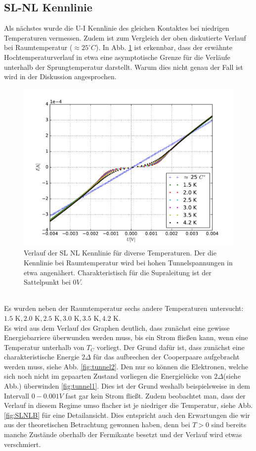 \documentclass[twoside,        %
               BCOR12mm,       %
               english,ngerman, %
               fleqn,headsepline=false,footsepline=false
              ]{MFPREPORT}
\begin{document}
\subsection{SL-NL Kennlinie}

Als nächstes wurde die U-I Kennlinie des gleichen Kontaktes bei niedrigen Temperaturen vermessen. Zudem ist zum Vergleich der oben diskutierte Verlauf bei Raumtemperatur ($\approx 25^{\circ} C$). In Abb. \ref{fig:SLNL} ist erkennbar, dass der erwähnte Hochtemperaturverlauf in etwa eine asymptotische Grenze für die Verläufe unterhalb der Sprungtemperatur darstellt. Warum dies nicht genau der Fall ist wird in der Diskussion angesprochen.
\begin{figure}
\centering
\includegraphics[scale=0.7]{2.pdf}
\caption{Verlauf der SL NL Kennlinie für diverse Temperaturen. Der die Kennlinie bei Raumtemperatur wird bei hohen Tunnelspannungen in etwa angenähert. Charakteristisch für die Supraleitung ist der Sattelpunkt bei $0 V$.}
\label{fig:SLNL}
\end{figure}
\\
Es wurden neben der Raumtemperatur sechs andere Temperaturen untersucht:
\\
$1.5 \text{ K}, 2.0 \text{ K}, 2.5 \text{ K}, 3.0  \text{ K}, 3.5 \text{ K}, 4.2 \text{ K}$.
\\
Es wird aus dem Verlauf des Graphen deutlich, dass zunächst eine gewisse Energiebarriere überwunden werden muss, bis ein Strom fließen kann, wenn eine Temperatur unterhalb von $T_C$ vorliegt.
Der Grund dafür ist, dass zunächst eine charakteristische Energie $2 \Delta$ für das aufbrechen der Cooperpaare aufgebracht werden muss, siehe Abb. \ref{fig:tunnel2}. 
Den nur so können die Elektronen, welche sich noch nicht im gepaarten Zustand vorliegen die Energielücke von $2 \Delta$(siehe Abb.) überwinden \ref{fig:tunnel1}. Dies ist der Grund weshalb beispielsweise in dem Intervall $0-0.001 V$ fast gar kein Strom fließt. 
Zudem beobachtet man, dass der Verlauf in diesem Regime umso flacher ist je niedriger die Temperatur, siehe Abb. \ref{fig:SLNLB} für eine Detailansicht.
Dies entspricht auch den Erwartungen die wir aus der theoretischen Betrachtung gewonnen haben, denn bei $T > 0$ sind bereits manche Zustände oberhalb der Fermikante besetzt und der Verlauf wird etwas verschmiert.
\end{document}
